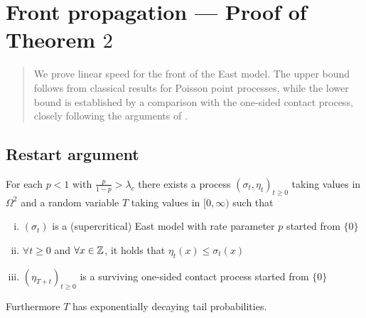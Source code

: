 \section{Front propagation --- Proof of Theorem $2$}

\begin{quote}
{\small We prove linear speed for the front of the East model. The upper bound follows from classical results for Poisson point processes, while the lower bound is established by a comparison with the one-sided contact process, closely following the arguments of \cite{blondel2018front}. }
\end{quote}

\subsection{Restart argument}

\begin{theorem}\label{thm:restart_coupling}
For each $p < 1$ with $\frac{p}{1-p} > \lambda_c$ there exists a process $(\sigma_t, \eta_t)_{t \geq 0}$ taking values in $\Omega^2$ and a random variable $T$ taking values in $[0, \infty)$ such that 
\begin{enumerate}[(i)]
  \item $(\sigma_t)$ is a (supercritical) East model with rate parameter $p$ started from $\{0\}$
  \item $\forall t \geq 0$ and $\forall x \in \mathbb{Z}$, it holds that $\eta_t(x) \leq \sigma_t(x)$
  \item $(\eta_{T+t})_{t \geq 0}$ is a surviving one-sided contact process started from $\{0\}$
\end{enumerate}
Furthermore $T$ has exponentially decaying tail probabilities. 
\end{theorem}

